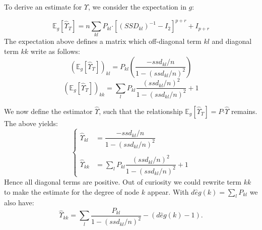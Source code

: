 \documentclass[11pt,a4paper]{article}
\newcommand{\Esp}{\mathds{E}}
\newcommand{\had}{\boldsymbol{\cdot}}
\begin{document}
To derive an estimate for $\Upsilon$, we consider the expectation in $g$:

$$\Esp_g[\widehat{\Upsilon}_T]= n\sum_{kl} P_{kl} \had [(SSD_{kl})^{-1} - I_2]^{p+r} + I_{p+r}$$
 The expectation above defines a matrix which off-diagonal term $kl$ and diagonal term $kk$ write as follows:
$$(\Esp_g[\widehat{\Upsilon}_T])_{kl} = P_{kl} \left(\frac{-ssd_{kl}/n}{1-(ssd_{kl}/n)^2} \right)$$ 
$$(\Esp_g[\widehat{\Upsilon}_T])_{kk} = \sum_l P_{kl} \frac{(ssd_{kl}/n)^2}{1-(ssd_{kl}/n)^2} +1 $$
 
 We now define the estimator $\widehat{\Upsilon}$, such that the relationship $\Esp_g[\widehat{\Upsilon}_T]=P\had \widehat{\Upsilon}$ remains. The above yields:
 \[\left\{\begin{array}{rl}
 \widehat{\Upsilon}_{kl} &= \dfrac{-ssd_{kl}/n}{1-(ssd_{kl}/n)^2} \\\\
 \widehat{\Upsilon}_{kk} &=\sum_l P_{kl} \dfrac{(ssd_{kl}/n)^2}{1-(ssd_{kl}/n)^2} +1
 \end{array}\right.
 \]
Hence all diagonal terms are positive. Out of curiosity we could rewrite term $kk$ to make the estimate for the degree of node $k$ appear. With $d\widehat{e}g(k)=\sum_l P_{kl}$ we also have:
$$\widehat{\Upsilon}_{kk} =\sum_l \frac{P_{kl} }{1-(ssd_{kl}/n)^2} -(d\widehat{e}g(k)-1).$$

\newpage

 \appendix
 
\end{document}
